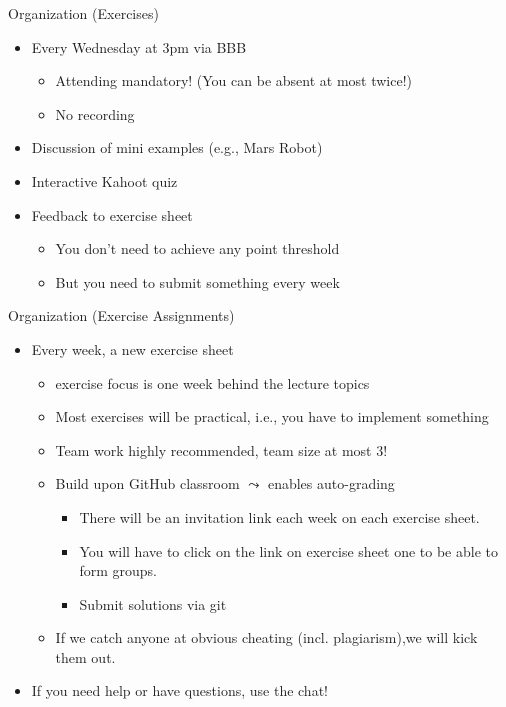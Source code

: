 \begin{frame}[c]{Organization (Exercises)}
	
	\begin{itemize}
		\item Every Wednesday at 3pm via BBB
		\begin{itemize}
			\item Attending mandatory! (You can be absent at most twice!)
			\item No recording
		\end{itemize}
		\pause
		\item Discussion of mini examples (e.g., Mars Robot)
		\pause
		\item Interactive Kahoot quiz
		\pause
		\item Feedback to exercise sheet
		\begin{itemize}
			\item You don't need to achieve any point threshold
			\item But you need to submit something every week
		\end{itemize}
	
	\end{itemize}
	
\end{frame}
\begin{frame}[c]{Organization (Exercise Assignments)}
	
	\begin{itemize}
	\item Every week, a new exercise sheet
	\begin{itemize}
		\item exercise focus is one week behind the lecture topics
		\item Most exercises will be practical, i.e., you have to implement something
		\item Team work highly recommended, team size at most 3! 
		\pause
		\item Build upon GitHub classroom $\leadsto$ enables auto-grading
		\begin{itemize}
			\item There will be an invitation link each week on each exercise sheet.
			\item You will have to click on the link on exercise sheet one to be able to form groups.
			\item Submit solutions via git
		\end{itemize}
		\pause
		\item If we catch anyone at obvious cheating (incl. plagiarism),\newline we will kick them out.
	\end{itemize}
	\pause
	\item \alert{If you need help or have questions, use the chat!}
	\end{itemize}
	
\end{frame}
